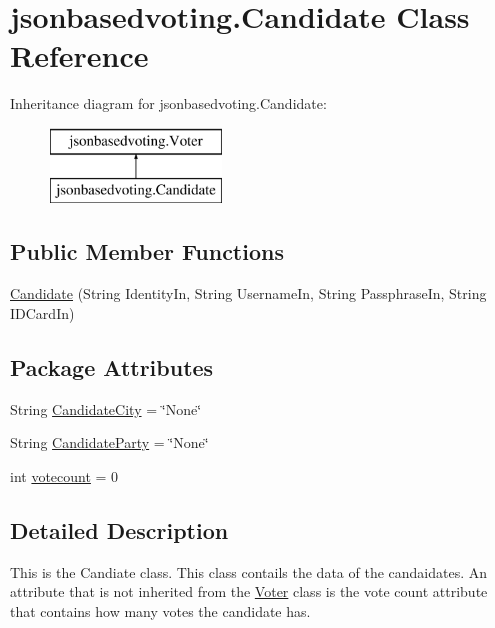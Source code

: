 \hypertarget{classjsonbasedvoting_1_1_candidate}{}\section{jsonbasedvoting.\+Candidate Class Reference}
\label{classjsonbasedvoting_1_1_candidate}
Inheritance diagram for jsonbasedvoting.\+Candidate\+:\begin{figure}[H]
\begin{center}
\leavevmode
\includegraphics[height=2.000000cm]{classjsonbasedvoting_1_1_candidate}
\end{center}
\end{figure}
\subsection*{Public Member Functions}
\begin{DoxyCompactItemize}
\item 
\mbox{\hyperlink{classjsonbasedvoting_1_1_candidate_a688d9c3d940d7858bdffb528bc46b880}{Candidate}} (String Identity\+In, String Username\+In, String Passphrase\+In, String I\+D\+Card\+In)
\end{DoxyCompactItemize}
\subsection*{Package Attributes}
\begin{DoxyCompactItemize}
\item 
String \mbox{\hyperlink{classjsonbasedvoting_1_1_candidate_a6d95daa929e46d70e7ce9fd1efd45eb0}{Candidate\+City}} = \char`\"{}None\char`\"{}
\item 
String \mbox{\hyperlink{classjsonbasedvoting_1_1_candidate_a6c5b2323d17ea42029d902379e74c2a9}{Candidate\+Party}} = \char`\"{}None\char`\"{}
\item 
int \mbox{\hyperlink{classjsonbasedvoting_1_1_candidate_acb80aff8c0ee8905e5477c4eef46baa3}{votecount}} = 0
\end{DoxyCompactItemize}


\subsection{Detailed Description}
This is the Candiate class. This class contails the data of the candaidates. An attribute that is not inherited from the \mbox{\hyperlink{classjsonbasedvoting_1_1_voter}{Voter}} class is the vote count attribute that contains how many votes the candidate has. ~\newline

